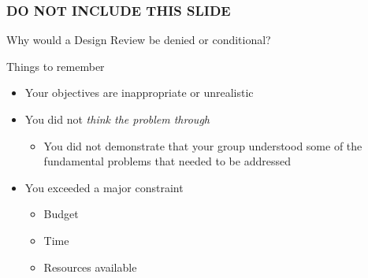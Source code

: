 \documentclass[11pt]{beamer}
\begin{document}
\begin{frame}
\frametitle{DO NOT INCLUDE THIS SLIDE}
Why would a Design Review be denied or conditional?
\begin{block}{Things to remember}
\begin{itemize}
\item Your objectives are inappropriate or unrealistic
\item You did not \emph{think the problem through}
\begin{itemize}
\item You did not demonstrate that your group understood some of the fundamental problems that needed to be addressed
\end{itemize}
\item You exceeded a major constraint
\begin{itemize}
\item Budget
\item Time
\item Resources available
\end{itemize}
\end{itemize}
\end{block}
\end{frame}
\end{document}
